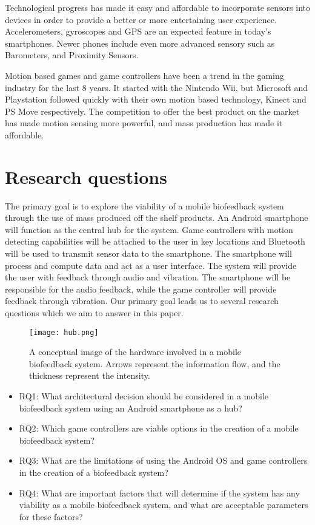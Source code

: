 Technological progress has made it easy and affordable to incorporate sensors into devices in order to provide a better or more entertaining user experience. Accelerometers, gyroscopes and GPS are an expected feature in today's smartphones. Newer phones include even more advanced sensory such as Barometers, and Proximity Sensors.

Motion based games and game controllers have been a trend in the gaming industry for the last 8 years. It started with the Nintendo Wii, but Microsoft and Playstation followed quickly with their own motion based technology, Kinect and PS Move respectively. The competition to offer the best product on the market has made motion sensing more powerful, and mass production has made it affordable.

\section{Research questions}
The primary goal is to explore the viability of a mobile biofeedback system through the use of mass produced off the shelf products. An Android smartphone will function as the central hub for the system. Game controllers with motion detecting capabilities will be attached to the user in key locations and Bluetooth will be used to transmit sensor data to the smartphone. The smartphone will process and compute data and act as a user interface. The system will provide the user with feedback through audio and vibration. The smartphone will be responsible for the audio feedback, while the game controller will provide feedback through vibration. Our primary goal leads us to several research questions which we aim to answer in this paper.

\begin{figure}[h!]
  \centering
    \texttt{[image: hub.png]}
    \caption{\footnotesize A conceptual image of the hardware involved in a mobile biofeedback system. Arrows represent the information flow, and the thickness represent the intensity.}
\end{figure}

\begin{itemize}
\item RQ1: What architectural decision should be considered in a mobile biofeedback system using an Android smartphone as a hub?
\item RQ2: Which game controllers are viable options in the creation of a mobile biofeedback system?
\item RQ3: What are the limitations of using the Android OS and game controllers in the creation of a biofeedback system?
\item RQ4: What are important factors that will determine if the system has any viability as a mobile biofeedback system, and what are acceptable parameters for these factors?
\end{itemize}

